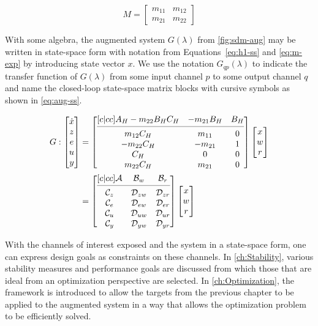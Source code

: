 \begin{equation}
	M = 
	\begin{bmatrix}
		m_{11} & m_{12} \\
		m_{21} & m_{22}
	\end{bmatrix} \label{eq:m-exp}
\end{equation}

With some algebra, the augmented system $G(\lambda)$ from \autoref{fig:sdm-aug} may be written in state-space form with notation from Equations~\ref{eq:h1-ss} and \ref{eq:m-exp} by introducing state vector $x$. We use the notation $G_{qp}(\lambda)$ to indicate the transfer function of $G(\lambda)$ from some input channel $p$ to some output channel $q$ and name the closed-loop state-space matrix blocks with cursive symbols as shown in \autoref{eq:aug-ss}.

\begin{align}
	G:
	\begin{bmatrix}
		\dot{x} \\
		z \\
		e \\
		u \\
		y
	\end{bmatrix} &=
	\begin{bmatrix}[c|cc]
		A_H - m_{22}B_HC_H & -m_{21}B_H & B_H \\
		\cmidrule(lr){1-3}
		m_{12}C_H & m_{11} & 0 \\
		-m_{22}C_H & -m_{21} & 1 \\
		C_H & 0 & 0 \\
		m_{22}C_H & m_{21} & 0
	\end{bmatrix}
	\begin{bmatrix}
		x \\
		w \\
		r
	\end{bmatrix} \label{eq:aug} \\
	&=
	\begin{bmatrix}[c|cc]
		\mathcal{A} & \mathcal{B}_w & \mathcal{B}_r \\
		\cmidrule(lr){1-3}
		\mathcal{C}_z & \mathcal{D}_{zw} & \mathcal{D}_{zr} \\
		\mathcal{C}_e & \mathcal{D}_{ew} & \mathcal{D}_{er} \\
		\mathcal{C}_u & \mathcal{D}_{uw} & \mathcal{D}_{ur} \\
		\mathcal{C}_y & \mathcal{D}_{yw} & \mathcal{D}_{yr}
	\end{bmatrix}
	\begin{bmatrix}
		x \\
		w \\
		r
	\end{bmatrix} \label{eq:aug-ss}
\end{align}

With the channels of interest exposed and the system in a state-space form, one can express design goals as constraints on these channels. In \autoref{ch:Stability}, various stability measures and performance goals are discussed from which those that are ideal from an optimization perspective are selected. In \autoref{ch:Optimization}, the framework is introduced to allow the targets from the previous chapter to be applied to the augmented system in a way that allows the optimization problem to be efficiently solved.